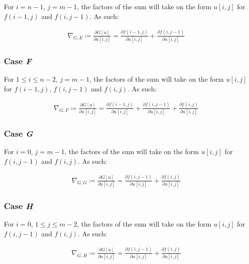 \documentclass[a4paper]{scrreprt}
\begin{document}
For $i = n - 1$, $j = m - 1$, the factors of the sum will take on the form
$u[i, j]$ for $f(i - 1, j)$ and $f(i, j - 1)$. As such:

\begin{align*}
		\nabla_{G, E} \coloneqq \frac{\partial G[u]}{\partial u[i, j]} = 
		  \frac{\partial f(i - 1, j)}{\partial u[i, j]}
		  + \frac{\partial f(i, j - 1)}{\partial u[i, j]}
\end{align*}

\subsubsection{Case \emph{F}}

For $1 \leq i \leq n - 2$, $j = m - 1$, the factors of the sum will take on the
form $u[i, j]$ for $f(i - 1, j)$, $f(i, j - 1)$ and $f(i, j)$. As such:

\begin{align*}
		\nabla_{G, F} \coloneqq \frac{\partial G[u]}{\partial u[i, j]} = 
		  \frac{\partial f(i - 1, j)}{\partial u[i, j]}
		  + \frac{\partial f(i, j - 1)}{\partial u[i, j]}
		  + \frac{\partial f(i, j)}{\partial u[i, j]}
\end{align*}

\subsubsection{Case \emph{G}}

For $i = 0$, $j = m -1$, the factors of the sum will take on the form $u[i, j]$
for $f(i, j - 1)$ and $f(i, j)$. As such:

\begin{align*}
		\nabla_{G, G} \coloneqq \frac{\partial G[u]}{\partial u[i, j]} = 
		  \frac{\partial f(i, j - 1)}{\partial u[i, j]}
		  + \frac{\partial f(i, j)}{\partial u[i, j]}
\end{align*}

\subsubsection{Case \emph{H}}

For $i = 0$, $1 \leq j \leq m - 2$, the factors of the sum will take on the
form $u[i, j]$ for $f(i, j - 1)$ and $f(i, j)$. As such:

\begin{align*}
		\nabla_{G, H} \coloneqq \frac{\partial G[u]}{\partial u[i, j]} = 
		  \frac{\partial f(i, j - 1)}{\partial u[i, j]}
		  + \frac{\partial f(i, j)}{\partial u[i, j]}
\end{align*}
\end{document}
